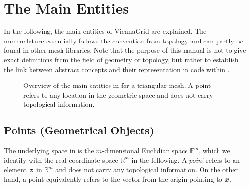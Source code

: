 \chapter{The Main Entities} \label{chap:entities}
In the following, the main entities of ViennaGrid are explained. The nomenclature essentially follows the convention from topology and can partly be found in other mesh libraries. Note that the purpose of this manual is not to give exact definitions from the field of geometry or topology, but rather to establish the link between abstract concepts and their representation in code within {\ViennaGrid}.

\begin{figure}[tb]
\centering
 \caption{Overview of the main entities in {\ViennaGrid} for a triangular mesh. A point refers to any location in the geometric space and does not carry topological information.}
 \label{fig:entities}
\end{figure}


\section{Points (Geometrical Objects)}
The underlying space in {\ViennaGrid} is the $m$-dimensional Euclidian space $\mathbb{E}^m$, which we identify with the real coordinate space $\mathbb{R}^m$ in the following.
A \emph{point} refers to an element $\boldsymbol{x}$ in $\mathbb{R}^m$ and does not carry any topological information. On the other hand, a point equivalently refers to the vector from the origin pointing to $\boldsymbol{x}$.

